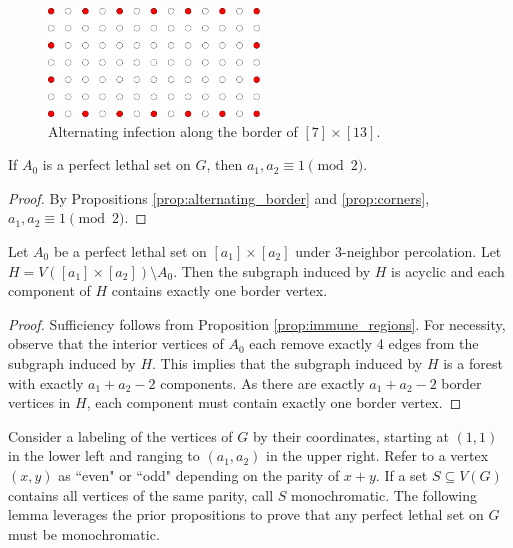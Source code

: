 \begin{figure}[]
\centering
\includegraphics[width=0.5\textwidth]{figures/6/border.pdf}
\caption{Alternating infection along the border of $[7] \times [13]$.}
\label{fig:border}
\end{figure} 

\begin{prop}
\label{prop:odd_by_odd}
If $A_0$ is a perfect lethal set on $G$, then $a_1, a_2 \equiv 1 \pmod 2$.
\end{prop}

\begin{proof}
By Propositions \ref{prop:alternating_border} and \ref{prop:corners}, $a_1, a_2 \equiv 1 \pmod 2$.
\end{proof}

\begin{prop}
\label{prop:one_border_vertex}
Let $A_0$ be a perfect lethal set on $[a_1] \times [a_2]$ under 3-neighbor percolation. Let $H = V([a_1] \times [a_2]) \setminus A_0$. Then the subgraph induced by $H$ is acyclic and each component of $H$ contains exactly one border vertex.
\end{prop}

\begin{proof}
Sufficiency follows from Proposition \ref{prop:immune_regions}. For necessity, observe that the interior vertices of $A_0$ each remove exactly 4 edges from the subgraph induced by $H$. This implies that the subgraph induced by $H$ is a forest with exactly $a_1 + a_2 - 2$ components. As there are exactly $a_1 + a_2 - 2$ border vertices in $H$, each component must contain exactly one border vertex.
\end{proof}

Consider a labeling of the vertices of $G$ by their coordinates, starting at $(1,1)$ in the lower left and ranging to $(a_1,a_2)$ in the upper right. Refer to a vertex $(x,y)$ as ``even" or ``odd" depending on the parity of $x+y$. If a set $S \subseteq V(G)$ contains all vertices of the same parity, call $S$ monochromatic. The following lemma leverages the prior propositions to prove that any perfect lethal set on $G$ must be monochromatic.


